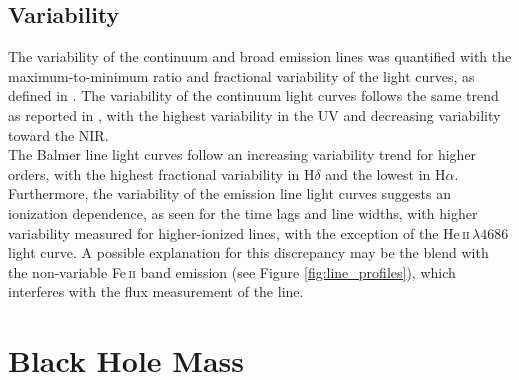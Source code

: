 


\subsection{Variability}

The variability of the continuum and broad emission lines was quantified with the maximum-to-minimum ratio and fractional variability of the light curves, as defined in \cite{rodriguez1997steps}. The variability of the continuum light curves follows the same trend as reported in \cite{cackett2018accretion}, with the highest variability in the UV and decreasing variability toward the NIR.\\
The Balmer line light curves follow an increasing variability trend for higher orders, with the highest fractional variability in H$\delta$ and the lowest in H$\alpha$. Furthermore, the variability of the emission line light curves suggests an ionization dependence, as seen for the time lags and line widths, with higher variability measured for higher-ionized lines, with the exception of the He\,\textsc{ii}$\,\lambda4686$ light curve. A possible explanation for this discrepancy may be the blend with the non-variable Fe\,\textsc{ii} band emission (see Figure \ref{fig:line_profiles}), which interferes with the flux measurement of the line. 



\section{Black Hole Mass}

